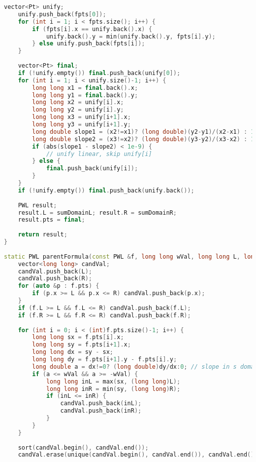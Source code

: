 \begin{lstlisting}[language=C++]
    vector<Pt> unify;
    unify.push_back(fpts[0]);
    for (int i = 1; i < fpts.size(); i++) {
        if (fpts[i].x == unify.back().x) {
            unify.back().y = min(unify.back().y, fpts[i].y);
        } else unify.push_back(fpts[i]);
    }
 
    vector<Pt> final;
    if (!unify.empty()) final.push_back(unify[0]);
    for (int i = 1; i < unify.size()-1; i++) {
        long long x1 = final.back().x;
        long long y1 = final.back().y;
        long long x2 = unify[i].x;
        long long y2 = unify[i].y;
        long long x3 = unify[i+1].x;
        long long y3 = unify[i+1].y;
        long double slope1 = (x2!=x1)? (long double)(y2-y1)/(x2-x1) : 1e9;
        long double slope2 = (x3!=x2)? (long double)(y3-y2)/(x3-x2) : 1e9;
        if (abs(slope1 - slope2) < 1e-9) {
            // unify linear, skip unify[i]
        } else {
            final.push_back(unify[i]);
        }
    }
    if (!unify.empty()) final.push_back(unify.back());
 
    PWL result;
    result.L = sumDomainL; result.R = sumDomainR;
    result.pts = final;
 
    return result;
}
 
static PWL parentFormula(const PWL &f, long long wVal, long long L, long long R) {
    vector<long long> candVal;
    candVal.push_back(L);
    candVal.push_back(R);
    for (auto &p : f.pts) {
        if (p.x >= L && p.x <= R) candVal.push_back(p.x);
    }
    if (f.L >= L && f.L <= R) candVal.push_back(f.L);
    if (f.R >= L && f.R <= R) candVal.push_back(f.R);
 
    for (int i = 0; i < (int)f.pts.size()-1; i++) {
        long long sx = f.pts[i].x;
        long long sy = f.pts[i+1].x;
        long long dx = sy - sx;
        long long dy = f.pts[i+1].y - f.pts[i].y;
        long double a = dx!=0? (long double)dy/dx:0; // slope in s domain
        if (a <= wVal && a >= -wVal) {
            long long inL = max(sx, (long long)L);
            long long inR = min(sy, (long long)R);
            if (inL <= inR) {
                candVal.push_back(inL);
                candVal.push_back(inR);
            }
        }
    }
 
    sort(candVal.begin(), candVal.end());
    candVal.erase(unique(candVal.begin(), candVal.end()), candVal.end());
 

\end{lstlisting}
